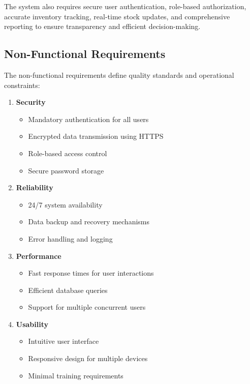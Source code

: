 The system also requires secure user authentication, role-based authorization, accurate inventory tracking, real-time stock updates, and comprehensive reporting to ensure transparency and efficient decision-making.

\subsection{Non-Functional Requirements}

The non-functional requirements define quality standards and operational constraints:

\begin{enumerate}
    \item \textbf{Security}
    \begin{itemize}
        \item Mandatory authentication for all users
        \item Encrypted data transmission using HTTPS
        \item Role-based access control
        \item Secure password storage
    \end{itemize}

    \item \textbf{Reliability}
    \begin{itemize}
        \item 24/7 system availability
        \item Data backup and recovery mechanisms
        \item Error handling and logging
    \end{itemize}

    \item \textbf{Performance}
    \begin{itemize}
        \item Fast response times for user interactions
        \item Efficient database queries
        \item Support for multiple concurrent users
    \end{itemize}

    \item \textbf{Usability}
    \begin{itemize}
        \item Intuitive user interface
        \item Responsive design for multiple devices
        \item Minimal training requirements
    \end{itemize}


\end{enumerate}
